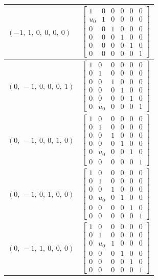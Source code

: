 \documentclass[11pt]{article}
\theoremstyle{definition}
\begin{document}
\begin{longtable}{|l|c|}
    \hline
    $\left( -1, \  1, \  0, \  0, \  0, \  0\right)$ & ${\left[\begin{matrix}1 & 0 & 0 & 0 & 0 & 0\\u_{0} & 1 & 0 & 0 & 0 & 0\\0 & 0 & 1 & 0 & 0 & 0\\0 & 0 & 0 & 1 & 0 & 0\\0 & 0 & 0 & 0 & 1 & 0\\0 & 0 & 0 & 0 & 0 & 1\end{matrix}\right]}$ \\
    \hline
    $\left( 0, \  -1, \  0, \  0, \  0, \  1\right)$ & ${\left[\begin{matrix}1 & 0 & 0 & 0 & 0 & 0\\0 & 1 & 0 & 0 & 0 & 0\\0 & 0 & 1 & 0 & 0 & 0\\0 & 0 & 0 & 1 & 0 & 0\\0 & 0 & 0 & 0 & 1 & 0\\0 & u_{0} & 0 & 0 & 0 & 1\end{matrix}\right]}$ \\
    \hline
    $\left( 0, \  -1, \  0, \  0, \  1, \  0\right)$ & ${\left[\begin{matrix}1 & 0 & 0 & 0 & 0 & 0\\0 & 1 & 0 & 0 & 0 & 0\\0 & 0 & 1 & 0 & 0 & 0\\0 & 0 & 0 & 1 & 0 & 0\\0 & u_{0} & 0 & 0 & 1 & 0\\0 & 0 & 0 & 0 & 0 & 1\end{matrix}\right]}$ \\
    \hline
    $\left( 0, \  -1, \  0, \  1, \  0, \  0\right)$ & ${\left[\begin{matrix}1 & 0 & 0 & 0 & 0 & 0\\0 & 1 & 0 & 0 & 0 & 0\\0 & 0 & 1 & 0 & 0 & 0\\0 & u_{0} & 0 & 1 & 0 & 0\\0 & 0 & 0 & 0 & 1 & 0\\0 & 0 & 0 & 0 & 0 & 1\end{matrix}\right]}$ \\
    \hline
    $\left( 0, \  -1, \  1, \  0, \  0, \  0\right)$ & ${\left[\begin{matrix}1 & 0 & 0 & 0 & 0 & 0\\0 & 1 & 0 & 0 & 0 & 0\\0 & u_{0} & 1 & 0 & 0 & 0\\0 & 0 & 0 & 1 & 0 & 0\\0 & 0 & 0 & 0 & 1 & 0\\0 & 0 & 0 & 0 & 0 & 1\end{matrix}\right]}$ \\

\end{longtable}
\end{document}

